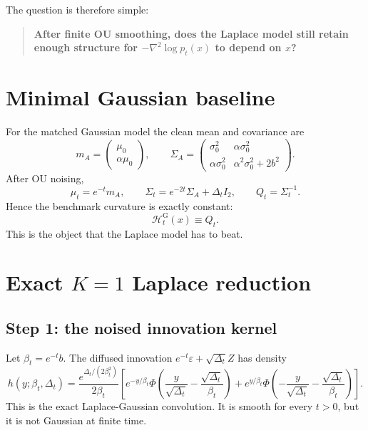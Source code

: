 \documentclass[11pt,a4paper]{article}
\newcommand{\Dt}{\Delta_t}
\newcommand{\pt}{p_t}
\newcommand{\Ht}{\mathcal{H}_t}
\newcommand{\PhiN}{\Phi}
\begin{document}
The question is therefore simple:
\begin{quote}
\textbf{After finite OU smoothing, does the Laplace model still retain enough structure for $-\nabla^2 \log \pt(x)$ to depend on $x$?}
\end{quote}

\section{Minimal Gaussian baseline}

For the matched Gaussian model the clean mean and covariance are
\begin{equation}
m_A =
\begin{pmatrix}
\mu_0 \\
\alpha \mu_0
\end{pmatrix},
\qquad
\Sigma_A =
\begin{pmatrix}
\sigma_0^2 & \alpha \sigma_0^2 \\
\alpha \sigma_0^2 & \alpha^2 \sigma_0^2 + 2b^2
\end{pmatrix}.
\label{eq:gaussian-clean}
\end{equation}
After OU noising,
\begin{equation}
\mu_t = e^{-t} m_A,
\qquad
\Sigma_t = e^{-2t} \Sigma_A + \Dt I_2,
\qquad
Q_t = \Sigma_t^{-1}.
\label{eq:gaussian-noisy}
\end{equation}
Hence the benchmark curvature is exactly constant:
\[
\Ht^{\mathrm G}(x) \equiv Q_t.
\]
This is the object that the Laplace model has to beat.

\section[Exact K=1 Laplace reduction]{Exact $K=1$ Laplace reduction}

\subsection*{Step 1: the noised innovation kernel}

Let $\beta_t = e^{-t} b$. The diffused innovation $e^{-t}\varepsilon + \sqrt{\Dt}Z$ has density
\begin{equation}
h(y;\beta_t,\Dt)
=
\frac{e^{\Dt/(2\beta_t^2)}}{2\beta_t}
\left[
 e^{-y/\beta_t}\PhiN\!\left(\frac{y}{\sqrt{\Dt}}-\frac{\sqrt{\Dt}}{\beta_t}\right)
 +
 e^{y/\beta_t}\PhiN\!\left(-\frac{y}{\sqrt{\Dt}}-\frac{\sqrt{\Dt}}{\beta_t}\right)
\right].
\label{eq:normal-laplace}
\end{equation}
This is the exact Laplace-Gaussian convolution. It is smooth for every $t>0$, but it is not Gaussian at finite time.
\end{document}
